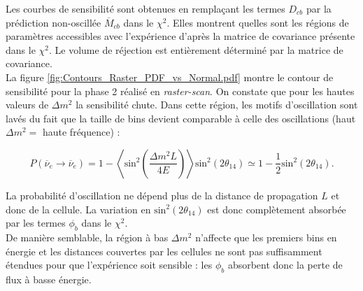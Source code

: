Les courbes de sensibilité sont obtenues en remplaçant les termes $D_{cb}$ par la prédiction non-oscillée $\overline{M}_{cb}$ dans le $\chi^2$. Elles montrent quelles sont les régions de paramètres accessibles avec l'expérience d'après la matrice de covariance présente dans le $\chi^2$. Le volume de réjection est entièrement déterminé par la matrice de covariance.\\

La figure \ref{fig:Contours_Raster_PDF_vs_Normal.pdf} montre le contour de sensibilité pour la phase 2 réalisé en \textit{raster-scan}. On constate que pour les hautes valeurs de $\Delta m^2$ la sensibilité chute. Dans cette région, les motifs d'oscillation sont lavés du fait que la taille de bins devient comparable à celle des oscillations (haut $\Delta m^2 = $ haute fréquence) :

\begin{equation}
    P(\overline{\nu}_e \rightarrow \overline{\nu}_e) = 1 - \left< \textrm{sin}^2\left(\frac{\Delta m^2L}{4E}\right) \right> \textrm{sin}^2(2\theta_{14}) \simeq 1 - \frac{1}{2} \textrm{sin}^2(2\theta_{14}).
\end{equation}

\bigbreak

La probabilité d'oscillation ne dépend plus de la distance de propagation $L$ et donc de la cellule. La variation en $\textrm{sin}^2(2\theta_{14})$ est donc complètement absorbée par les termes  $\phi_b$ dans le $\chi^2$.\\

De manière semblable, la région à bas $\Delta m^2$ n'affecte que les premiers bins en énergie et les distances couvertes par les cellules ne sont pas suffisamment étendues pour que l'expérience soit sensible : les $\phi_b$ absorbent donc la perte de flux à basse énergie.\\

